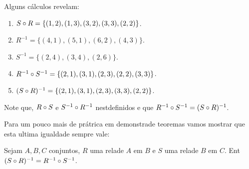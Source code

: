 Alguns c\'alculos revelam: 
\begin{enumerate}[{\bf a)}]
\item $S\circ R=\{(1,2),(1,3),(3,2),(3,3),(2,2)\}$.
\item $R^{-1}=\{(4,1),(5,1),(6,2),(4,3)\}$.
\item $S^{-1}=\{(2,4),(3,4),(2,6)\}$.
\item $R^{-1}\circ S^{-1}=\{(2,1),(3,1),(2,3),(2,2),(3,3)\}$.
\item $(S\circ R)^{-1}=\{(2,1),(3,1),(2,3),(3,3),(2,2)\}$.
\end{enumerate}
Note que, $R\circ S$ e $S^{-1}\circ R^{-1}$ n\ao est\ao definidos e que $R^{-1}\circ S^{-1}=(S\circ R)^{-1}$.

Para um pouco mais de pr\'atrica em demonstra\cao de teoremas vamos mostrar que esta ultima igualdade sempre vale:
\begin{teob}
Sejam $A,B,C$ conjuntos, $R$ uma rela\cao de $A$ em $B$ e $S$ uma rela\cao de $B$ em $C$. Ent\ao $(S\circ R)^{-1}=R^{-1}\circ S^{-1}$.
\end{teob}
